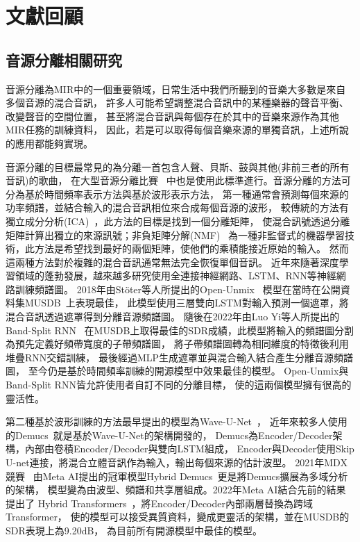 \documentclass[class=NCU_thesis, crop=false]{standalone}
\begin{document}
\pagebreak

\section{文獻回顧}
\subsection{音源分離相關研究}
音源分離為MIR中的一個重要領域，日常生活中我們所聽到的音樂大多數是來自多個音源的混合音訊，
許多人可能希望調整混合音訊中的某種樂器的聲音平衡、改變聲音的空間位置，
甚至將混合音訊與每個存在於其中的音樂來源作為其他MIR任務的訓練資料，
因此，若是可以取得每個音樂來源的單獨音訊，上述所說的應用都能夠實現。

音源分離的目標最常見的為分離一首包含人聲、貝斯、鼓與其他(非前三者的所有音訊)的歌曲，
在大型音源分離比賽~\cite{Yuki_Mitsufuji2021MusicDemixing, Fabbro_Giorgio2023TheSoundDemixing}
中也是使用此標準進行。音源分離的方法可分為基於時間頻率表示方法與基於波形表示方法，
第一種通常會預測每個來源的功率頻譜，並結合輸入的混合音訊相位來合成每個音源的波形，
較傳統的方法有獨立成分分析(ICA)~\cite{comon1994independent}，此方法的目標是找到一個分離矩陣，
使混合訊號透過分離矩陣計算出獨立的來源訊號；非負矩陣分解(NMF)~\cite{lee2000algorithms}
為一種非監督式的機器學習技術，此方法是希望找到最好的兩個矩陣，使他們的乘積能接近原始的輸入。
然而這兩種方法對於複雜的混合音訊通常無法完全恢復單個音訊。
近年來隨著深度學習領域的蓬勃發展，越來越多研究使用全連接神經網路、LSTM、RNN等神經網路訓練頻譜圖。
2018年由Stöter等人所提出的Open-Unmix~\cite{FabianRobert_Stöter2019OpenUnmix}
模型在當時在公開資料集MUSDB~\cite{Rafii2017musdb18}上表現最佳，
此模型使用三層雙向LSTM對輸入預測一個遮罩，將混合音訊透過遮罩得到分離音源頻譜圖。
隨後在2022年由Luo Yi等人所提出的Band-Split RNN~\cite{Luo_Yi2022MusicSourceSeparation}
在MUSDB上取得最佳的SDR成績，此模型將輸入的頻譜圖分割為預先定義好頻帶寬度的子帶頻譜圖，
將子帶頻譜圖轉為相同維度的特徵後利用堆疊RNN交錯訓練，
最後經過MLP生成遮罩並與混合輸入結合產生分離音源頻譜圖，
至今仍是基於時間頻率訓練的開源模型中效果最佳的模型。
Open-Unmix與Band-Split RNN皆允許使用者自訂不同的分離目標，
使的這兩個模型擁有很高的靈活性。

第二種基於波形訓練的方法最早提出的模型為Wave-U-Net~\cite{stoller2018wave}，
近年來較多人使用的Demucs~\cite{défossez2021music}就是基於Wave-U-Net的架構開發的，
Demucs為Encoder/Decoder架構，內部由卷積Encoder/Decoder與雙向LSTM組成，
Encoder與Decoder使用Skip U-net連接，將混合立體音訊作為輸入，輸出每個來源的估計波型。
2021年MDX競賽~\cite{Yuki_Mitsufuji2021MusicDemixing}
由Meta AI提出的冠軍模型Hybrid Demucs~\cite{defossez2021hybrid}更是將Demucs擴展為多域分析的架構，
模型變為由波型、頻譜和共享層組成。2022年Meta AI結合先前的結果提出了
Hybrid Transformers~\cite{rouard2023hybrid}，將Encoder/Decoder內部兩層替換為跨域Transformer，
使的模型可以接受異質資料，變成更靈活的架構，並在MUSDB的SDR表現上為9.20dB，
為目前所有開源模型中最佳的模型。
\end{document}
